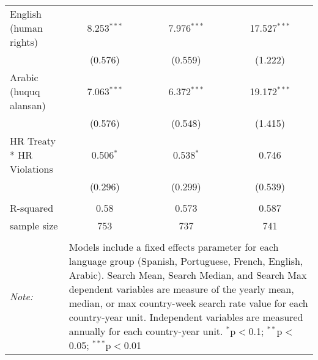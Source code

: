 \begin{table}[!htbp]
\begin{tabular}{@{\extracolsep{5pt}}lccc}
  English (human rights) & 8.253$^{***}$ & 7.976$^{***}$ & 17.527$^{***}$ \\ 
  & (0.576) & (0.559) & (1.222) \\ 
  Arabic (huquq alansan) & 7.063$^{***}$ & 6.372$^{***}$ & 19.172$^{***}$ \\ 
  & (0.576) & (0.548) & (1.415) \\ 
  HR Treaty * HR Violations & 0.506$^{*}$ & 0.538$^{*}$ & 0.746 \\ 
  & (0.296) & (0.299) & (0.539) \\ 
 \hline \\[-1.8ex] 
R-squared  & 0.58 & 0.573 & 0.587 \\ 
sample size  & 753 & 737 & 741 \\ 
\hline 
\hline \\[-1.8ex] 
\textit{Note:}  & \multicolumn{3}{l}{\parbox[t]{8cm}{Models include a fixed effects parameter for each language group (Spanish, Portuguese, French, English, Arabic). Search Mean, Search Median, and Search Max dependent variables are measure of the yearly mean, median, or max country-week search rate value for each country-year unit. Independent variables are measured annually for each country-year unit. $^{*}$p$<$0.1; $^{**}$p$<$0.05; $^{***}$p$<$0.01}} \\ 
\end{tabular} 
\end{table} 
